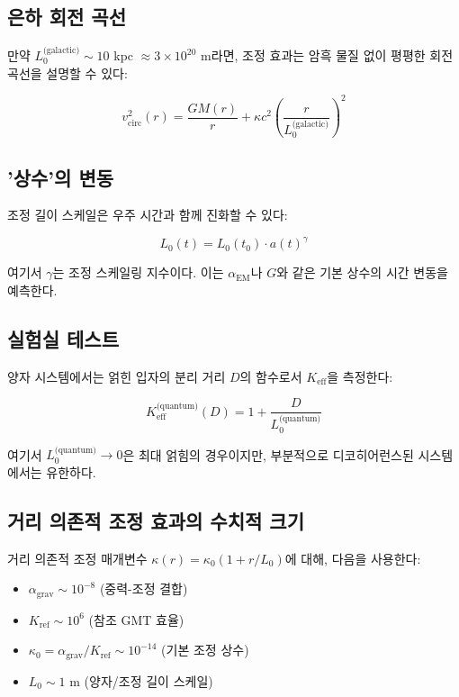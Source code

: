 \documentclass[11pt,a4paper]{article}
\begin{document}
\subsection{은하 회전 곡선}

만약 $L_0^{\text{(galactic)}} \sim 10$ kpc $\approx 3\times10^{20}$ m라면, 조정 효과는 암흑 물질 없이 평평한 회전 곡선을 설명할 수 있다:

\begin{equation}
v_{\text{circ}}^2(r) = \frac{GM(r)}{r} + \kappa c^2 \left(\frac{r}{L_0^{\text{(galactic)}}}\right)^2
\end{equation}

\subsection{'상수'의 변동}

조정 길이 스케일은 우주 시간과 함께 진화할 수 있다:

\begin{equation}
L_0(t) = L_0(t_0) \cdot a(t)^\gamma
\end{equation}

여기서 $\gamma$는 조정 스케일링 지수이다. 이는 $\alpha_{\text{EM}}$나 $G$와 같은 기본 상수의 시간 변동을 예측한다.

\subsection{실험실 테스트}

양자 시스템에서는 얽힌 입자의 분리 거리 $D$의 함수로서 $K_{\mathrm{eff}}$을 측정한다:

\begin{equation}
K_{\mathrm{eff}}^{\text{(quantum)}}(D) = 1 + \frac{D}{L_0^{\text{(quantum)}}}
\end{equation}

여기서 $L_0^{\text{(quantum)}} \to 0$은 최대 얽힘의 경우이지만, 부분적으로 디코히어런스된 시스템에서는 유한하다.

\subsection{거리 의존적 조정 효과의 수치적 크기}
\label{subsec:numerical-magnitudes}

거리 의존적 조정 매개변수 $\kappa(r) = \kappa_0(1 + r/L_0)$에 대해, 다음을 사용한다:
\begin{itemize}
\item $\alpha_{\text{grav}} \sim 10^{-8}$ (중력-조정 결합)
\item $K_{\text{ref}} \sim 10^6$ (참조 GMT 효율)
\item $\kappa_0 = \alpha_{\text{grav}}/K_{\text{ref}} \sim 10^{-14}$ (기본 조정 상수)
\item $L_0 \sim 1$ m (양자/조정 길이 스케일)
\end{itemize}
\end{document}
